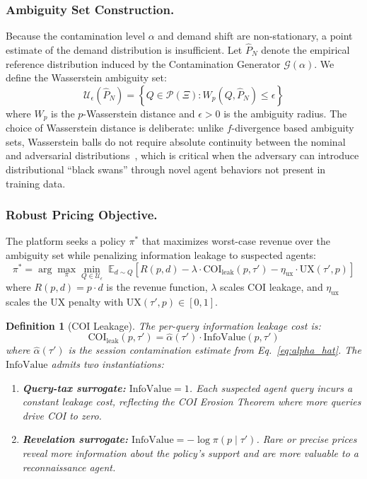 \documentclass[sigconf]{acmart}
\newtheorem{definition}{Definition}
\begin{document}
\subsubsection{Ambiguity Set Construction.}
Because the contamination level $\alpha$ and demand shift are non-stationary, a point estimate of the demand distribution is insufficient. Let $\hat{P}_N$ denote the empirical reference distribution induced by the Contamination Generator $\mathcal{G}(\alpha)$. We define the Wasserstein ambiguity set:
\begin{equation}
\mathcal{U}_\epsilon(\hat{P}_N) = \left\{ Q \in \mathcal{P}(\Xi) : W_p(Q, \hat{P}_N) \le \epsilon \right\}
\end{equation}
where $W_p$ is the $p$-Wasserstein distance and $\epsilon > 0$ is the ambiguity radius. The choice of Wasserstein distance is deliberate: unlike $f$-divergence based ambiguity sets, Wasserstein balls do not require absolute continuity between the nominal and adversarial distributions~\cite{kuhn_wasserstein_2024}, which is critical when the adversary can introduce distributional ``black swans'' through novel agent behaviors not present in training data.

\subsubsection{Robust Pricing Objective.}
The platform seeks a policy $\pi^*$ that maximizes worst-case revenue over the ambiguity set while penalizing information leakage to suspected agents:
\begin{equation}
\label{eq:robust_policy}
\pi^* = \arg \max_{\pi} \min_{Q \in \mathcal{U}_\epsilon} \; \mathbb{E}_{d \sim Q} \left[ R(p, d) - \lambda \cdot \text{COI}_{\text{leak}}(p, \tau') - \eta_{\text{ux}} \cdot \text{UX}(\tau', p) \right]
\end{equation}
where $R(p, d) = p \cdot d$ is the revenue function, $\lambda$ scales COI leakage, and $\eta_{\text{ux}}$ scales the UX penalty with $\text{UX}(\tau', p)\in[0,1]$.

\begin{definition}[COI Leakage]
The per-query information leakage cost is:
\begin{equation}
\text{COI}_{\text{leak}}(p,\tau') = \hat{\alpha}(\tau') \cdot \text{InfoValue}(p,\tau')
\end{equation}
where $\hat{\alpha}(\tau')$ is the session contamination estimate from Eq.~\ref{eq:alpha_hat}. The $\text{InfoValue}$ admits two instantiations:
\begin{enumerate}
    \item \textbf{Query-tax surrogate:} $\text{InfoValue} = 1$. Each suspected agent query incurs a constant leakage cost, reflecting the COI Erosion Theorem where more queries drive COI to zero.
    \item \textbf{Revelation surrogate:} $\text{InfoValue} = -\log \pi(p \mid \tau')$. Rare or precise prices reveal more information about the policy's support and are more valuable to a reconnaissance agent.
\end{enumerate}
\end{definition}
\end{document}
